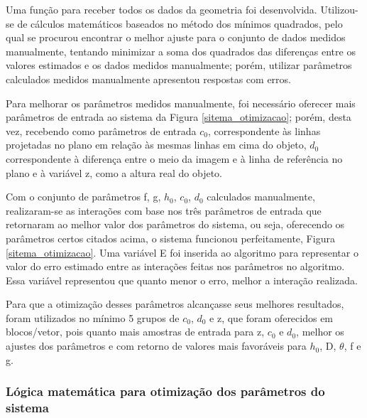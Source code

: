 \documentclass[a4paper, 12pt]{article}
\begin{document}
Uma função para receber todos os dados da geometria foi desenvolvida. Utilizou-se de cálculos matemáticos baseados no método dos mínimos quadrados, pelo qual se procurou encontrar o melhor ajuste para o conjunto de dados medidos manualmente, tentando minimizar a soma dos quadrados das diferenças entre os valores estimados e os dados medidos manualmente; porém, utilizar parâmetros calculados medidos manualmente apresentou respostas com erros.

Para melhorar os parâmetros medidos manualmente, foi necessário oferecer mais parâmetros de entrada ao sistema da Figura \ref{sitema_otimizacao}; porém, desta vez, recebendo como parâmetros de entrada $c_0$, correspondente às linhas projetadas no plano em relação às mesmas linhas em cima do objeto, $d_0$ correspondente à diferença entre o meio da imagem e à linha de referência no plano e à variável z, como a altura real do objeto.

Com o conjunto de parâmetros f, g, $h_0$, $c_0$, $d_0$ calculados manualmente, realizaram-se as interações com base nos três parâmetros de entrada que retornaram ao melhor valor dos parâmetros do sistema, ou seja, oferecendo os parâmetros certos citados acima, o sistema funcionou perfeitamente, Figura \ref{sitema_otimizacao}. Uma variável E foi inserida ao algoritmo para representar o valor do erro estimado entre as interações feitas nos parâmetros no algoritmo. Essa variável representou que quanto menor o erro, melhor a interação realizada.

Para que a otimização desses parâmetros alcançasse seus melhores resultados, foram utilizados no mínimo 5 grupos de $c_0$, $d_0$ e z, que foram oferecidos em blocos/vetor, pois quanto mais amostras de entrada para z, $c_0$ e $d_0$, melhor os ajustes dos parâmetros e com retorno de valores mais favoráveis para $h_0$, D, $\theta$, f e g. 

\subsubsection{Lógica matemática para otimização dos parâmetros do sistema}
\end{document}
